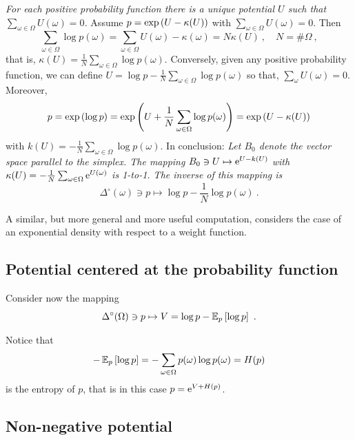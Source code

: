 \documentclass[12pt,a4paper]{amsart}
\theoremstyle{plain}%
\theoremstyle{definition}
\theoremstyle{remark}
\begin{document}
\emph{For each positive probability function there is a unique potential $U$ such that $\sum_{\omega \in \Omega} U(\omega) = 0$.} Assume $p = \exp\left(U - \kappa(U)\right)$ with $\sum_{\omega \in \Omega} U(\omega) = 0$. Then
\begin{equation*}
  \sum_{\omega\in\Omega} \log p(\omega) = \sum_{\omega \in \Omega} U(\omega) - \kappa(\omega) = N \kappa(U) \ , \quad N = \# \Omega \ ,
\end{equation*}
that is, $\kappa(U) = \frac1N \sum_{\omega\in\Omega} \log p(\omega)$. Conversely, given any positive probability function, we can define $U = \log p - \frac1N \sum_{\omega\in\Omega} \log p(\omega)$ so that, $\sum_{\omega} U(\omega) = 0$. Moreover,
\begin{equation*}
  p = \exp\left(\log p\right) = \exp\left(U + \frac1N \sum_{\omega\in\Omega} \log p(\omega)\right) = \exp\left(U - \kappa(U)\right) 
\end{equation*}
with $k(U) = - \frac1N \sum_{\omega\in\Omega} \log p(\omega)$. In conclusion: \emph{Let $B_0$ denote the vector space parallel to the simplex. The mapping $B_0 \ni U \mapsto \mathrm{e}^{U-k(U)}$ with $\kappa(U) = - \frac1N \sum_{\omega\in\Omega} \mathrm{e}^{U(\omega)}$ is 1-to-1. The inverse of this mapping is}
  \begin{equation*}
    \Delta^\circ(\omega) \ni p\mapsto \log p - \frac1N \log p(\omega) \ .
  \end{equation*}

A similar, but more general and more useful computation, considers the case of an exponential density with respect to a weight function.

  \subsection{Potential centered at the probability function}
\label{sec:potent-cent-at}

Consider now the mapping
\begin{equation*}
  \Delta^\circ(\Omega) \ni p \mapsto V = \log p - \operatorname{\mathbb E}_{p}\left[\log p\right] \ .
\end{equation*}

Notice that
\begin{equation*}
  - \operatorname{\mathbb E}_{p}\left[\log p\right] = - \sum_{\omega\in\Omega} p(\omega) \log p(\omega) = H(p)
\end{equation*}
is the entropy of $p$, that is in this case $p = \mathrm{e}^{V + H(p)}$.

\subsection{Non-negative potential}
\label{sec:non-negat-potent}
\end{document}
